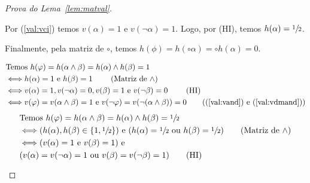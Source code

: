 \begin{proof}[Prova do Lema~\ref{lem:matval}]
\begin{provaporcasos}
\begin{provaporsubcasos}
                            Por (\ref{val:vci}) temos $v(\alpha) = 1$ e $v(\neg \alpha) = 1$. Logo, por (HI), temos $h(\alpha) = \sfrac{1}{2}{}$.

                            Finalmente, pela matriz de $\circ$, temos $h(\phi) = h(\circ \alpha) = \circ h(\alpha) = 0$.
                        
                \end{provaporsubcasos}
            

                \begin{provaporsubcasos}
                    \begin{align*}
                        &\text{Temos } h(\phi) = h(\alpha \land \beta) = h(\alpha) \land h(\beta) = 1\\
                        &\Longleftrightarrow h(\alpha) = 1 \text{ e } {h(\beta) = 1} \tag*{ (Matriz de $\land$)}\\
                        &\Longleftrightarrow v(\alpha) = 1, v(\neg \alpha) = 0, v(\beta) = 1 \text{ e } v(\neg \beta) = 0\tag*{ (HI)}\\
                        &\Longleftrightarrow v(\phi) = v(\alpha \land \beta) = 1 \textnormal{ e } v(\neg \phi) = v(\neg(\alpha \land \beta)) = 0\tag*{((\ref{val:vand}) e (\ref{val:vdmand}))}\\
                    \end{align*}
                    \vspace*{-2\baselineskip}
                    \begin{align*}
                        &\text{Temos } h(\phi) = h(\alpha \land \beta) = h(\alpha) \land h(\beta) = \meio{}\\
                        &\Longleftrightarrow (h(\alpha), h(\beta) \in \{1, \meio{}\})\textnormal{ e }(h(\alpha) = \meio{} \text{ ou } h(\beta) = \meio{}) \tag*{(Matriz de $\land$)}\\
                        &\Longleftrightarrow (v(\alpha) = 1 \text{ e } v(\beta) = 1) \text{ e }\\&(v(\alpha) = v(\neg \alpha) = 1 \text{ ou } v(\beta) = v(\neg \beta) = 1) \tag*{(HI)}\\

\end{align*}
\end{provaporsubcasos}
\end{provaporcasos}
\end{proof}
